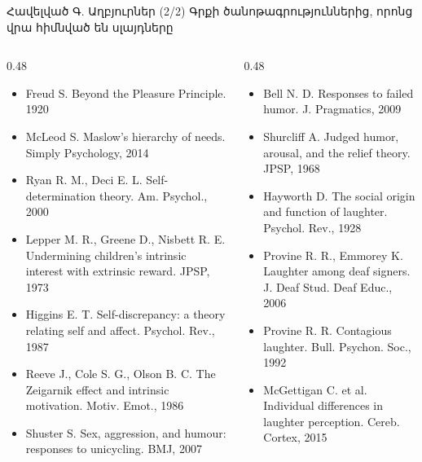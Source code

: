 \begin{frame}{Հավելված Գ. Աղբյուրներ (2/2)}
  \scriptsize
  Գրքի ծանոթագրություններից, որոնց վրա հիմնված են սլայդները\par\smallskip
  \begin{columns}[T]
    \begin{column}{0.48\textwidth}
      \begin{itemize}\setlength{\itemsep}{0.4mm}
        \item Freud S. Beyond the Pleasure Principle. 1920
        \item McLeod S. Maslow's hierarchy of needs. Simply Psychology, 2014
        \item Ryan R. M., Deci E. L. Self-determination theory. Am. Psychol., 2000
        \item Lepper M. R., Greene D., Nisbett R. E. Undermining children's intrinsic interest with extrinsic reward. JPSP, 1973
        \item Higgins E. T. Self-discrepancy: a theory relating self and affect. Psychol. Rev., 1987
        \item Reeve J., Cole S. G., Olson B. C. The Zeigarnik effect and intrinsic motivation. Motiv. Emot., 1986
        \item Shuster S. Sex, aggression, and humour: responses to unicycling. BMJ, 2007
      \end{itemize}
    \end{column}
    \begin{column}{0.48\textwidth}
      \begin{itemize}\setlength{\itemsep}{0.4mm}
        \item Bell N. D. Responses to failed humor. J. Pragmatics, 2009
        \item Shurcliff A. Judged humor, arousal, and the relief theory. JPSP, 1968
        \item Hayworth D. The social origin and function of laughter. Psychol. Rev., 1928
        \item Provine R. R., Emmorey K. Laughter among deaf signers. J. Deaf Stud. Deaf Educ., 2006
        \item Provine R. R. Contagious laughter. Bull. Psychon. Soc., 1992
        \item McGettigan C. et al. Individual differences in laughter perception. Cereb. Cortex, 2015
      \end{itemize}
    \end{column}
  \end{columns}
\end{frame}
